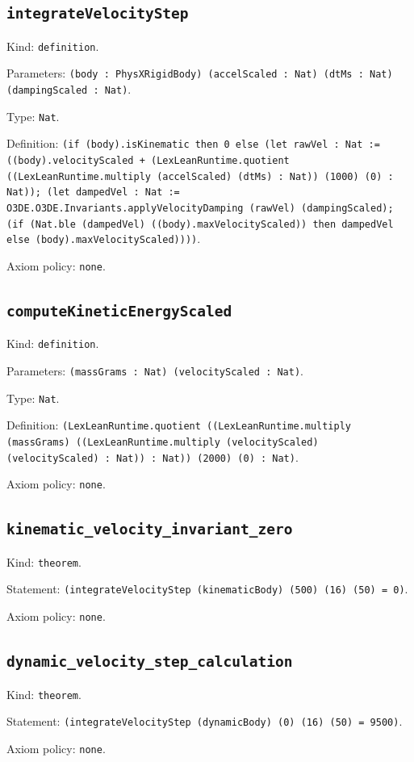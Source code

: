 \documentclass[11pt]{article}
\begin{document}
\subsection*{\texttt{integrateVelocityStep}}
\noindent Kind: \texttt{definition}.\par
\noindent Parameters: \texttt{(body : PhysXRigidBody) (accelScaled : Nat) (dtMs : Nat) (dampingScaled : Nat)}.\par
\noindent Type: \texttt{Nat}.\par
\noindent Definition: \texttt{(if (body).isKinematic then 0 else (let rawVel : Nat := ((body).velocityScaled + (LexLeanRuntime.quotient ((LexLeanRuntime.multiply (accelScaled) (dtMs) : Nat)) (1000) (0) : Nat)); (let dampedVel : Nat := O3DE.O3DE.Invariants.applyVelocityDamping (rawVel) (dampingScaled); (if (Nat.ble (dampedVel) ((body).maxVelocityScaled)) then dampedVel else (body).maxVelocityScaled))))}.\par
\noindent Axiom policy: \texttt{none}.\par
\subsection*{\texttt{computeKineticEnergyScaled}}
\noindent Kind: \texttt{definition}.\par
\noindent Parameters: \texttt{(massGrams : Nat) (velocityScaled : Nat)}.\par
\noindent Type: \texttt{Nat}.\par
\noindent Definition: \texttt{(LexLeanRuntime.quotient ((LexLeanRuntime.multiply (massGrams) ((LexLeanRuntime.multiply (velocityScaled) (velocityScaled) : Nat)) : Nat)) (2000) (0) : Nat)}.\par
\noindent Axiom policy: \texttt{none}.\par
\subsection*{\texttt{kinematic\_velocity\_invariant\_zero}}
\noindent Kind: \texttt{theorem}.\par
\noindent Statement: \texttt{(integrateVelocityStep (kinematicBody) (500) (16) (50) = 0)}.\par
\noindent Axiom policy: \texttt{none}.\par
\subsection*{\texttt{dynamic\_velocity\_step\_calculation}}
\noindent Kind: \texttt{theorem}.\par
\noindent Statement: \texttt{(integrateVelocityStep (dynamicBody) (0) (16) (50) = 9500)}.\par
\noindent Axiom policy: \texttt{none}.\par
\end{document}
